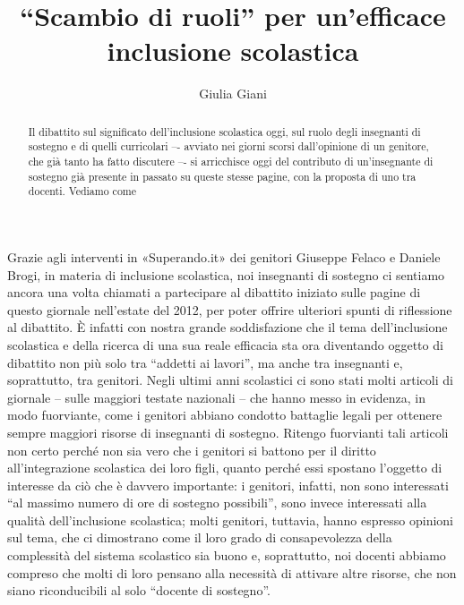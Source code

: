 \author{Giulia Giani}
\title{“Scambio di ruoli” per un'efficace inclusione scolastica}
\label{cha:giani300413}
\begin{abstract}
Il dibattito sul significato dell'inclusione scolastica oggi, sul ruolo degli insegnanti di sostegno e di quelli curricolari –- avviato nei giorni scorsi dall'opinione di un genitore, che già tanto ha fatto discutere –- si arricchisce oggi del contributo di un'insegnante di sostegno già presente in passato su queste stesse pagine, con la proposta di uno  tra docenti. Vediamo come
\end{abstract}
\maketitle
{}
Grazie agli interventi in «Superando.it» dei genitori Giuseppe Felaco e Daniele Brogi, in materia di inclusione scolastica, noi insegnanti di sostegno ci sentiamo ancora una volta chiamati a partecipare al dibattito iniziato sulle pagine di questo giornale nell'estate del 2012, per poter offrire ulteriori spunti di riflessione al dibattito. È infatti con nostra grande soddisfazione che il tema dell'inclusione scolastica e della ricerca di una sua reale efficacia sta ora diventando oggetto di dibattito non più solo tra “addetti ai lavori”, ma anche tra insegnanti e, soprattutto, tra genitori.
Negli ultimi anni scolastici ci sono stati molti articoli di giornale – sulle maggiori testate nazionali – che hanno messo in evidenza, in modo fuorviante, come i genitori abbiano condotto battaglie legali per ottenere sempre maggiori risorse di insegnanti di sostegno. Ritengo fuorvianti tali articoli non certo perché non sia vero che i genitori si battono per il diritto all'integrazione scolastica dei loro figli, quanto perché essi spostano l'oggetto di interesse da ciò che è davvero importante: i genitori, infatti, non sono interessati “al massimo numero di ore di sostegno possibili”, sono invece interessati alla qualità dell'inclusione scolastica; molti genitori, tuttavia, hanno espresso opinioni sul tema, che ci dimostrano come il loro grado di consapevolezza della complessità del sistema scolastico sia buono e, soprattutto, noi docenti abbiamo compreso che molti di loro pensano alla necessità di attivare altre risorse, che non siano riconducibili al solo “docente di sostegno”.

